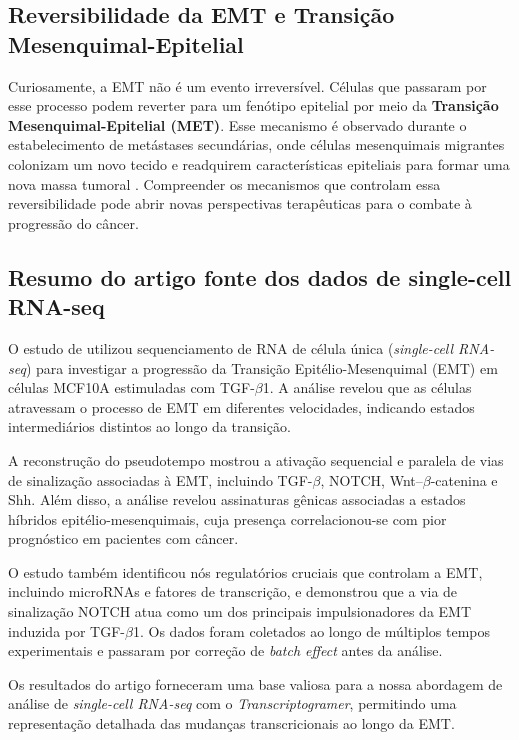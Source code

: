\documentclass[12pt]{article}
\begin{document}
\subsection{Reversibilidade da EMT e Transição Mesenquimal-Epitelial}

Curiosamente, a EMT não é um evento irreversível. Células que passaram por esse processo podem reverter para um fenótipo epitelial por meio da \textbf{Transição Mesenquimal-Epitelial (MET)}. Esse mecanismo é observado durante o estabelecimento de metástases secundárias, onde células mesenquimais migrantes colonizam um novo tecido e readquirem características epiteliais para formar uma nova massa tumoral \cite{dongre}. Compreender os mecanismos que controlam essa reversibilidade pode abrir novas perspectivas terapêuticas para o combate à progressão do câncer.

\subsection{Resumo do artigo fonte dos dados de single-cell RNA-seq}

O estudo de \cite{deshmukh} utilizou sequenciamento de RNA de célula única (\textit{single-cell RNA-seq}) para investigar a progressão da Transição Epitélio-Mesenquimal (EMT) em células MCF10A estimuladas com TGF-$\beta$1. A análise revelou que as células atravessam o processo de EMT em diferentes velocidades, indicando estados intermediários distintos ao longo da transição.  

A reconstrução do pseudotempo mostrou a ativação sequencial e paralela de vias de sinalização associadas à EMT, incluindo TGF-$\beta$, NOTCH, Wnt–$\beta$-catenina e Shh. Além disso, a análise revelou assinaturas gênicas associadas a estados híbridos epitélio-mesenquimais, cuja presença correlacionou-se com pior prognóstico em pacientes com câncer.  

O estudo também identificou nós regulatórios cruciais que controlam a EMT, incluindo microRNAs e fatores de transcrição, e demonstrou que a via de sinalização NOTCH atua como um dos principais impulsionadores da EMT induzida por TGF-$\beta$1. Os dados foram coletados ao longo de múltiplos tempos experimentais e passaram por correção de \textit{batch effect} antes da análise.  

Os resultados do artigo forneceram uma base valiosa para a nossa abordagem de análise de \textit{single-cell RNA-seq} com o \textit{Transcriptogramer}, permitindo uma representação detalhada das mudanças transcricionais ao longo da EMT.  
\end{document}
